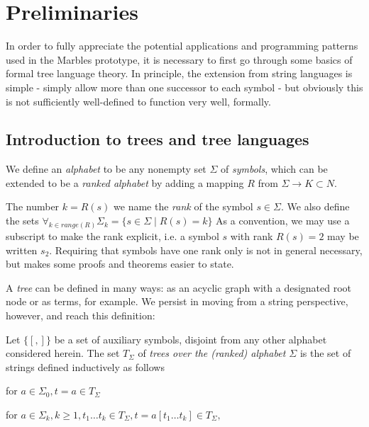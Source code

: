 \section{Preliminaries}

In order to fully appreciate the potential applications and programming
patterns used in the Marbles prototype, it is necessary to first go through
some basics of formal tree language theory. In principle, the extension
from string languages is simple - simply allow more than one successor to
each symbol - but obviously this is not sufficiently well-defined to
function very well, formally.

\subsection{Introduction to trees and tree languages}

We define an \emph{alphabet} to be any nonempty set $\Sigma$ of
\emph{symbols}, which can be extended to be a \emph{ranked alphabet}
by adding a mapping $R$ from $\Sigma \rightarrow K \subset N$.

The number $k = R(s)$ we name the \emph{rank} of the symbol $s \in \Sigma$.
We also define the sets $ \forall_{k \in \mathit{range}(R)} \Sigma_k = \{s \in \Sigma \mid R(s) = k\}$
As a convention, we may use a subscript to make the rank explicit, i.e. a
symbol $s$ with rank $R(s) = 2$ may be written $s_2$. Requiring that
symbols have one rank only is not in general necessary, but makes some
proofs and theorems easier to state.

A \emph{tree} can be defined in many ways: as an acyclic graph with a
designated root node or as terms, for example. We persist in moving from a
string perspective, however, and reach this definition:

Let $\{[, ]\}$ be a set of auxiliary symbols, disjoint from any other alphabet considered herein.
The set $T_\Sigma$ of \emph{trees over the (ranked)
alphabet $\Sigma$} is the set of strings defined inductively as follows
\begin{compactitem}
\item for  $a \in \Sigma_0, t = a \in T_\Sigma$
\item for  $a \in \Sigma_k, k \geq 1, t_1 \ldots t_k \in T_\Sigma,  t = a[t_1
\ldots t_k] \in T_\Sigma,$
\end{compactitem}





